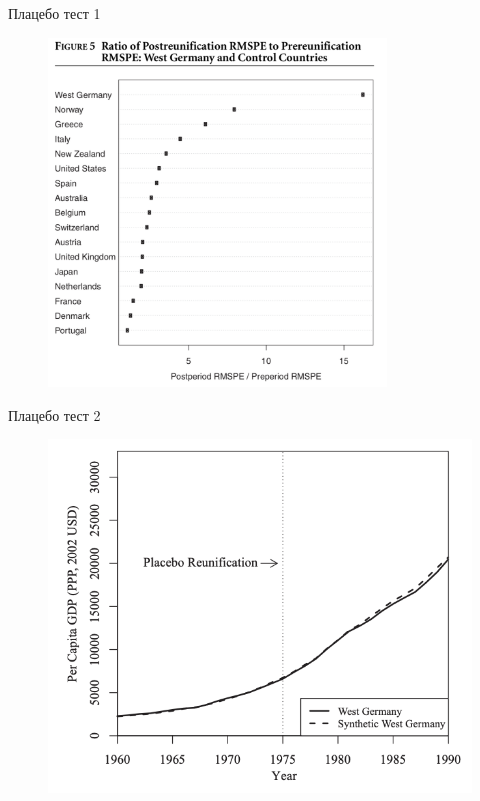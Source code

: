 \begin{frame}{Плацебо тест 1}
    \begin{figure}
        \centering
        \includegraphics[width=0.8\textwidth]{Images/germany_placebo.png}
    \end{figure}
\end{frame}


\begin{frame}{Плацебо тест 2}
    \begin{figure}
        \centering
        \includegraphics[width=\textwidth]{Images/germany_placebo2.png}
    \end{figure}
\end{frame}





